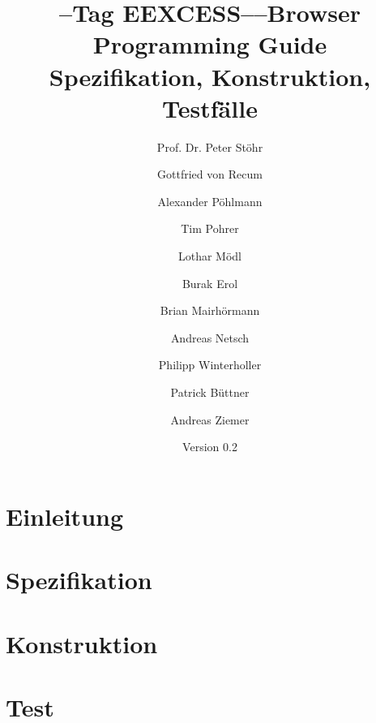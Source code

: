 \documentclass[
    DIV12,
    cleardouble=plain,
    headings=normal,
    pdftex,
    headexclude,footexclude,
    final
]{scrreprt}
\title{
  \SEARCH--Tag
  EEXCESS--\SECH--Browser \\[1em]
  Programming Guide\\
Spezifikation, Konstruktion, Testfälle
}
\author{Prof. Dr. Peter Stöhr \and Gottfried von Recum \and Alexander Pöhlmann \and Tim Pohrer \and Lothar Mödl \and Burak Erol \and Brian Mairhörmann \and Andreas Netsch \and Philipp Winterholler \and Patrick Büttner \and Andreas Ziemer}
\date{Version 0.2}
\begin{document}
\maketitle
{}
\tableofcontents

\newpage
{}

\part{Einleitung}





\part{Spezifikation}






\part{Konstruktion}















\part{Test}


\newpage
\listoffigures
\listoftables
\end{document}
